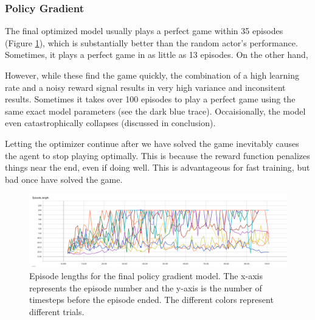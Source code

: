 \documentclass[12pt,a4paper]{article}
\begin{document}
\subsubsection*{Policy Gradient}

The final optimized model usually plays a perfect game within 35 episodes (Figure \ref{pg_episodes}), which is substantially better than the random actor's performance. Sometimes, it plays a perfect game in as little as 13 episodes. On the other hand, 

However, while these find the game quickly, the combination of a high learning rate and a noisy reward signal results in very high variance and inconsitent results. Sometimes it takes over 100 episodes to play a perfect game using the same exact model parameters (see the dark blue trace). Occaisionally, the model even catastrophically collapses (discussed in conclusion).

Letting the optimizer continue after we have solved the game inevitably causes the agent to stop playing optimally. This is because the reward function penalizes things near the end, even if doing well. This is advantageous for fast training, but bad once have solved the game.

\begin{figure}[htbp]
\begin{center}
\includegraphics[width=\linewidth]{pg_episodes.png}
\caption{Episode lengths for the final policy gradient model.  The x-axis represents the episode number and the y-axis is the number of timesteps before the episode ended. The different colors represent different trials.  }
\label{pg_episodes}
\end{center}
\end{figure}
\end{document}
